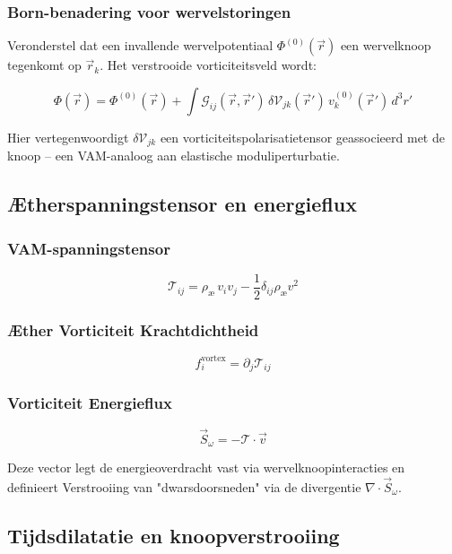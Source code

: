 \subsubsection*{Born-benadering voor wervelstoringen}

Veronderstel dat een invallende wervelpotentiaal \(\Phi^{(0)}(\vec{r})\) een wervelknoop tegenkomt op \(\vec{r}_k\). Het verstrooide vorticiteitsveld wordt:

\[
\Phi(\vec{r}) = \Phi^{(0)}(\vec{r}) + \int \mathcal{G}_{ij}(\vec{r}, \vec{r}') \, \delta \mathcal{V}_{jk}(\vec{r}') \, v_k^{(0)}(\vec{r}') \, d^3r'
\]

Hier vertegenwoordigt \(\delta \mathcal{V}_{jk}\) een vorticiteitspolarisatietensor geassocieerd met de knoop – een VAM-analoog aan elastische moduliperturbatie.

\subsection{Ætherspanningstensor en energieflux}

\subsubsection*{VAM-spanningstensor}

\[
\mathcal{T}_{ij} = \rho_{\text{\ae}} \, v_i v_j - \frac{1}{2} \delta_{ij} \rho_{\text{\ae}} v^2
\]

\subsubsection*{Æther Vorticiteit Krachtdichtheid}

\[
f_i^{\text{vortex}} = \partial_j \mathcal{T}_{ij}
\]

\subsubsection*{Vorticiteit Energieflux}

\[
\vec{S}_\omega = - \mathcal{T} \cdot \vec{v}
\]

Deze vector legt de energieoverdracht vast via wervelknoopinteracties en definieert Verstrooiing van "dwarsdoorsneden" via de divergentie \(\nabla \cdot \vec{S}_\omega\).

\subsection{Tijdsdilatatie en knoopverstrooiing}

